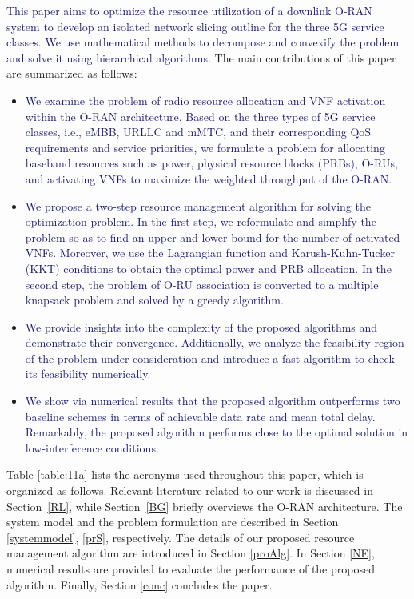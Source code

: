 \documentclass[lettersize,journal]{IEEEtran}
\begin{document}
\textcolor{MidnightBlue}{This paper aims to optimize the resource utilization of a downlink O-RAN system to develop an isolated network slicing outline for the three 5G service classes.
We use mathematical methods to decompose and convexify the problem and solve it using hierarchical algorithms.}
 The main contributions of this paper are summarized as follows:
\begin{itemize}
\item \textcolor{MidnightBlue}{We examine the problem of radio resource allocation and VNF activation within the O-RAN architecture.
Based on the three types of 5G service classes, i.e., eMBB, URLLC and mMTC, and their corresponding QoS requirements and service priorities, we formulate a problem for allocating baseband resources such as power, physical resource blocks (PRBs), O-RUs, and activating VNFs to maximize the weighted throughput of the O-RAN.}
\item \textcolor{MidnightBlue}{We propose a two-step resource management algorithm for solving the optimization problem.
In the first step, we reformulate and simplify the problem so as to find an upper and lower bound for the number of activated VNFs. Moreover, we use the Lagrangian function and Karush-Kuhn-Tucker (KKT) conditions to obtain the optimal power and PRB allocation. In the second step, the problem of O-RU association is converted to a multiple knapsack problem and solved by a greedy algorithm.}
\item \textcolor{MidnightBlue}{We provide insights into the complexity of the proposed algorithms and demonstrate their convergence. Additionally, we analyze the feasibility region of the problem under consideration and introduce a fast algorithm to check its feasibility numerically.}
\item \textcolor{MidnightBlue}{We show via numerical results that the proposed algorithm outperforms two baseline schemes in terms of achievable data rate and mean total delay. Remarkably, the proposed algorithm performs close to the optimal solution in low-interference conditions.}
\end{itemize}

Table \ref{table:11a} lists the acronyms used throughout this paper, which is organized as follows.
Relevant literature related to our work is discussed in Section~\ref{RL}, while Section~\ref{BG} briefly overviews the O-RAN architecture.
The system model and the problem formulation are described in Section \ref{systemmodel}, \ref{prS}, respectively. The details of our proposed resource management algorithm are introduced in Section \ref{proAlg}. In Section \ref{NE}, numerical results are provided to evaluate the performance of the proposed algorithm. Finally, Section \ref{conc} concludes the paper.
\end{document}
